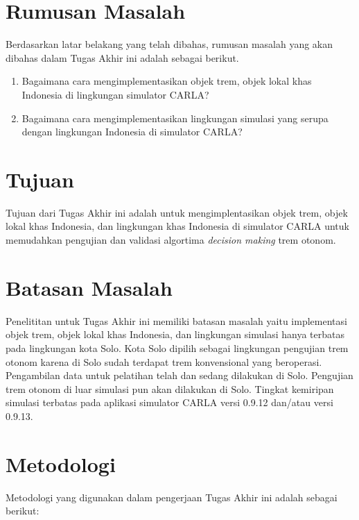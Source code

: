 \section{Rumusan Masalah}

Berdasarkan latar belakang yang telah dibahas, rumusan masalah yang akan dibahas
dalam Tugas Akhir ini adalah sebagai berikut.

\begin{enumerate}

    \item Bagaimana cara mengimplementasikan objek trem, objek lokal khas
    Indonesia di lingkungan simulator CARLA?

    \item Bagaimana cara mengimplementasikan lingkungan simulasi yang serupa
    dengan lingkungan Indonesia di simulator CARLA?

\end{enumerate}

\section{Tujuan}

Tujuan dari Tugas Akhir ini adalah untuk mengimplentasikan objek trem, objek
lokal khas Indonesia, dan lingkungan khas Indonesia di simulator CARLA untuk
memudahkan pengujian dan validasi algortima \textit{decision making} trem
otonom.

\section{Batasan Masalah}

Penelititan untuk Tugas Akhir ini memiliki batasan masalah yaitu implementasi
objek trem, objek lokal khas Indonesia, dan lingkungan simulasi hanya terbatas
pada lingkungan kota Solo. Kota Solo dipilih sebagai lingkungan pengujian trem
otonom karena di Solo sudah terdapat trem konvensional yang beroperasi.
Pengambilan data untuk pelatihan telah dan sedang dilakukan di Solo. Pengujian
trem otonom di luar simulasi pun akan dilakukan di Solo. Tingkat kemiripan
simulasi terbatas pada aplikasi simulator CARLA versi 0.9.12 dan/atau versi
0.9.13.

\section{Metodologi}

Metodologi yang digunakan dalam pengerjaan Tugas Akhir ini adalah sebagai
berikut:

